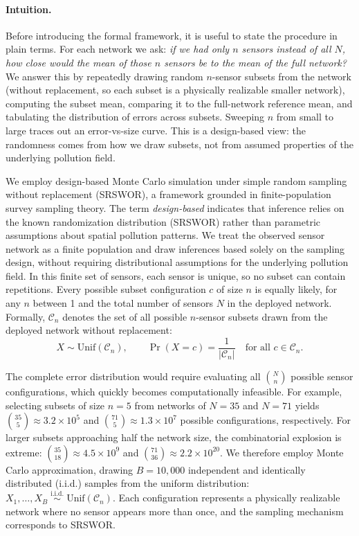 \documentclass[12pt]{article}
\theoremstyle{remark}
\begin{document}
\paragraph{Intuition.} Before introducing the formal framework, it is useful to state the procedure in plain terms. For each network we ask: \emph{if we had only $n$ sensors instead of all $N$, how close would the mean of those $n$ sensors be to the mean of the full network?} We answer this by repeatedly drawing random $n$-sensor subsets from the network (without replacement, so each subset is a physically realizable smaller network), computing the subset mean, comparing it to the full-network reference mean, and tabulating the distribution of errors across subsets. Sweeping $n$ from small to large traces out an error-vs-size curve. This is a design-based view: the randomness comes from how we draw subsets, not from assumed properties of the underlying pollution field.

We employ design-based Monte Carlo simulation under simple random sampling without replacement (SRSWOR), a framework grounded in finite-population survey sampling theory.\supercite{cochran_sampling_1977,lohr_sampling_2021} The term \emph{design-based} indicates that inference relies on the known randomization distribution (SRSWOR) rather than parametric assumptions about spatial pollution patterns. We treat the observed sensor network as a finite population and draw inferences based solely on the sampling design, without requiring distributional assumptions for the underlying pollution field. In this finite set of sensors, each sensor is unique, so no subset can contain repetitions. Every possible subset configuration $c$ of size $n$ is equally likely, for any $n$ between 1 and the total number of sensors $N$ in the deployed network. Formally, $\mathcal{C}_n$ denotes the set of all possible $n$-sensor subsets drawn from the deployed network without replacement:
\begin{equation}\label{eq:SRSWOR_random_distribution}
X \sim \mathrm{Unif}(\mathcal{C}_n),
\qquad
\Pr(X = c) = \frac{1}{|\mathcal{C}_n|}
\quad \text{for all } c \in \mathcal{C}_n.
\end{equation}

The complete error distribution would require evaluating all $\binom{N}{n}$ possible sensor configurations, which quickly becomes computationally infeasible. For example, selecting subsets of size $n=5$ from networks of $N=35$ and $N=71$ yields $\binom{35}{5} \approx 3.2 \times 10^5$ and $\binom{71}{5} \approx 1.3 \times 10^7$ possible configurations, respectively. For larger subsets approaching half the network size, the combinatorial explosion is extreme: $\binom{35}{18} \approx 4.5 \times 10^9$ and $\binom{71}{36} \approx 2.2 \times 10^{20}$. We therefore employ Monte Carlo approximation, drawing $B = 10{,}000$ independent and identically distributed (i.i.d.) samples from the uniform distribution: $X_1, \dots, X_B \;\overset{\text{i.i.d.}}{\sim}\; \mathrm{Unif}(\mathcal{C}_n).$ Each configuration represents a physically realizable network where no sensor appears more than once, and the sampling mechanism corresponds to SRSWOR.
\end{document}
